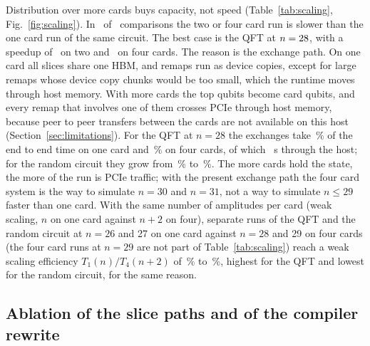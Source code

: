 Distribution over more cards buys capacity, not speed (Table~\ref{tab:scaling}, Fig.~\ref{fig:scaling}). In
\NumScaleBelowOne~of \NumScaleCases~comparisons the two or four card run is slower than the one card run of the same
circuit. The best case is the QFT at $n=28$, with a speedup of \NumQftTwentyEightSpeedupTwo~on two and
\NumScaleBestFour~on four cards. The reason is the exchange path. On one card all slices share one HBM, and remaps run as
device copies, except for large remaps whose device copy chunks would be too small, which the runtime moves through host
memory. With more cards the top qubits become card qubits, and every remap that involves one of them crosses PCIe through
host memory, because peer to peer transfers between the cards are not available on this host
(Section~\ref{sec:limitations}). For the QFT at $n=28$ the exchanges take \NumScaleExchQftOne\,\% of the end to end
time on one card and \NumScaleExchQftFour\,\% on four cards, of which \NumScaleExchHostQftFour~s through the host; for the
random circuit they grow from \NumScaleExchRandOne\,\% to \NumScaleExchRandFour\,\%. The more cards hold the state,
the more of the run is PCIe traffic; with the present exchange path the four card system is the way to simulate
$n=30$ and $n=31$, not a way to simulate $n\le 29$ faster than one card. With the same number of amplitudes per card (weak scaling, $n$ on one card against $n+2$ on four), separate runs
of the QFT and the random circuit at $n=26$ and 27 on one card against $n=28$ and 29 on four cards (the four card runs
at $n=29$ are not part of Table~\ref{tab:scaling}) reach a weak scaling efficiency $T_1(n)/T_4(n+2)$ of
\NumWeakEffFourMin\,\% to \NumWeakEffFourMax\,\%, highest for the QFT and lowest for the random circuit, for the same
reason.

\subsection{Ablation of the slice paths and of the compiler rewrite}\label{subsec:res-ablation}

\begin{table}[t]
\caption{Slice paths switched off one at a time and together on two and four cards ($C$), at the largest width of the
ablation: end to end time (median) and number of remaps with all paths on and all off.}\label{tab:ablation}

\end{table}

\begin{table}[t]
\caption{Baseline design, QFT on four cards with and without the partition diagonal path (the diagonal gates then
take the exchange path): routing, execution time, host compute and barrier time (slowest card), PCIe bytes of all cards,
and the speedup of the diagonal path (medians).}\label{tab:diag}

\end{table}

